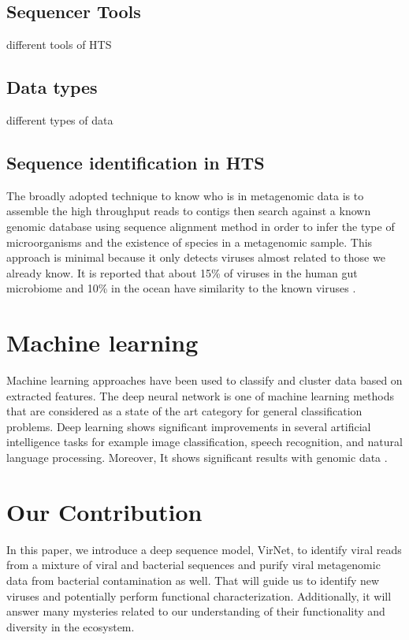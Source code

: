 \subsection{Sequencer Tools}

different tools of HTS
\subsection{Data types}
different types of data

\subsection{Sequence identification in HTS}


The broadly adopted technique to know who is in metagenomic data is to assemble the high throughput reads to contigs then search against a known genomic database using sequence alignment method in order to infer the type of microorganisms and the existence of species in a metagenomic sample. This approach is minimal because it only detects viruses almost related to those we already know. It is reported that about 15\% of viruses in the human gut microbiome and 10\% in the ocean have similarity to the known viruses \cite{ren2017virfinder}. 

\section{Machine learning}

Machine learning approaches have been used to classify and cluster data based on extracted features. The deep neural network is one of machine learning methods that are considered as a state of the art category for general classification problems. Deep learning shows significant improvements in several artificial intelligence tasks for example image classification, speech recognition, and natural language processing. Moreover, It shows significant results with genomic data \cite{angermueller2016deep}. %

\section{Our Contribution}

In this paper, we introduce a deep sequence model, VirNet, to identify viral reads from a mixture of viral and bacterial sequences and purify viral metagenomic data from bacterial contamination as well. That will guide us to identify new viruses and potentially perform functional characterization. Additionally, it will answer many mysteries related to our understanding of their functionality and diversity in the ecosystem.

